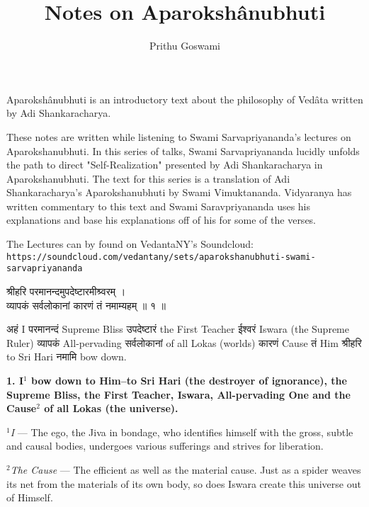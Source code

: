 \documentclass{article}
\title{Notes on Aparokshânubhuti}
\author{Prithu Goswami}
\date{}
\begin{document}
\maketitle

\begin{shaded}
Aparokshânubhuti is an introductory text about the philosophy of Vedâta written
by Adi Shankaracharya.

These notes are written while listening to Swami Sarvapriyananda's lectures on
Aparokshanubhuti.  In this series of talks, Swami Sarvapriyananda lucidly
unfolds the path to direct "Self-Realization" presented by Adi Shankaracharya
in Aparokshanubhuti.  The text for this series is a translation of Adi
Shankaracharya's Aparokshanubhuti by Swami Vimuktananda. Vidyaranya has written
commentary to this text and Swami Saravpriyananda uses his explanations and
base his explanations off of his for some of the verses.

The Lectures can by found on VedantaNY's Soundcloud:\\ 
{\footnotesize\texttt{https://soundcloud.com/vedantany/sets/aparokshanubhuti-swami-sarvapriyananda}} 
\end{shaded}



\begin{large}
\begin{hindi}
    \begin{center}
   श्रीहरि परमानन्दमुपदेष्टारमीश्र्वरम्  ।\\
  व्यापकं सर्वलोकानां कारणं तं नमाम्यहम् ॥ १ ॥
    \end{center}
\end{hindi}
\end{large}

\texthindi{अहं}
I
\texthindi{परमानन्दं}
Supreme Bliss
\texthindi{उपदेष्टारं}
the First Teacher
\texthindi{ईश्वरं}
Iswara (the Supreme Ruler)
\texthindi{व्यापकं}
All-pervading
\texthindi{सर्वलोकानां}
of all Lokas (worlds)
\texthindi{कारणं}
Cause
\texthindi{तं}
Him
\texthindi{श्रीहरि}
to Sri Hari
\texthindi{नमामि}
bow down.

\bigskip

\textbf{
    1. I$^1$ bow down to Him--to Sri Hari (the destroyer of ignorance), the
    Supreme Bliss, the First Teacher, Iswara, All-pervading One and the
    Cause$^2$ of all Lokas (the universe).
}

{\small
\textit{$^1$I} --- The ego, the Jiva in bondage, who identifies himself with
the gross, subtle and causal bodies, undergoes various sufferings and strives
for liberation.

\textit{$^2$The Cause} --- The efficient as well as the material cause. Just
as a spider weaves its net from the materials of its own body, so does
Iswara create this universe out of Himself.
}
\end{document}
